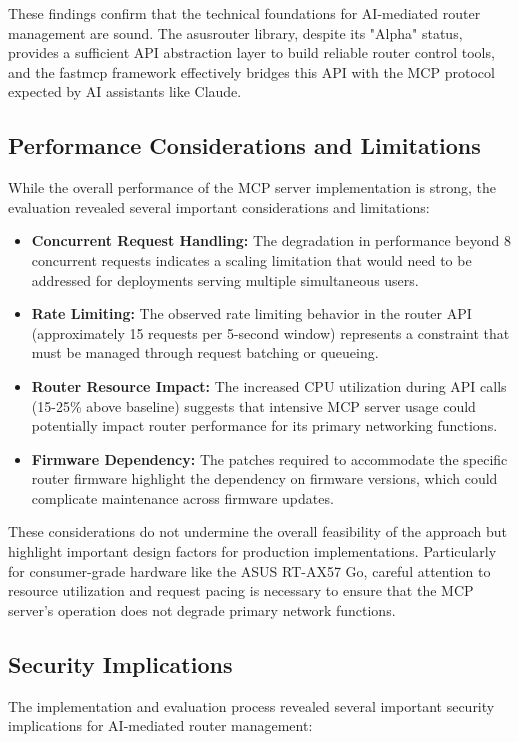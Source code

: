 These findings confirm that the technical foundations for AI-mediated router management are sound. The asusrouter library, despite its "Alpha" status, provides a sufficient API abstraction layer to build reliable router control tools, and the fastmcp framework effectively bridges this API with the MCP protocol expected by AI assistants like Claude.

\subsection{Performance Considerations and Limitations}
While the overall performance of the MCP server implementation is strong, the evaluation revealed several important considerations and limitations:

\begin{itemize}
\item \textbf{Concurrent Request Handling:} The degradation in performance beyond 8 concurrent requests indicates a scaling limitation that would need to be addressed for deployments serving multiple simultaneous users.
\item \textbf{Rate Limiting:} The observed rate limiting behavior in the router API (approximately 15 requests per 5-second window) represents a constraint that must be managed through request batching or queueing.
\item \textbf{Router Resource Impact:} The increased CPU utilization during API calls (15-25\% above baseline) suggests that intensive MCP server usage could potentially impact router performance for its primary networking functions.
\item \textbf{Firmware Dependency:} The patches required to accommodate the specific router firmware highlight the dependency on firmware versions, which could complicate maintenance across firmware updates.
\end{itemize}

These considerations do not undermine the overall feasibility of the approach but highlight important design factors for production implementations. Particularly for consumer-grade hardware like the ASUS RT-AX57 Go, careful attention to resource utilization and request pacing is necessary to ensure that the MCP server's operation does not degrade primary network functions.

\subsection{Security Implications}
The implementation and evaluation process revealed several important security implications for AI-mediated router management:


